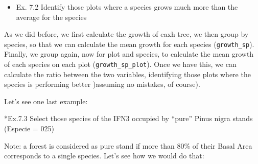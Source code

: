 \documentclass[]{article}
\newenvironment{Shaded}{\begin{snugshade}}{\end{snugshade}}
\newcommand{\KeywordTok}[1]{\textcolor[rgb]{0.13,0.29,0.53}{\textbf{#1}}}
\newcommand{\DataTypeTok}[1]{\textcolor[rgb]{0.13,0.29,0.53}{#1}}
\newcommand{\FloatTok}[1]{\textcolor[rgb]{0.00,0.00,0.81}{#1}}
\newcommand{\StringTok}[1]{\textcolor[rgb]{0.31,0.60,0.02}{#1}}
\newcommand{\OperatorTok}[1]{\textcolor[rgb]{0.81,0.36,0.00}{\textbf{#1}}}
\newcommand{\NormalTok}[1]{#1}
\providecommand{\tightlist}{%
  \setlength{\itemsep}{0pt}\setlength{\parskip}{0pt}}
\begin{document}
\begin{itemize}
\tightlist
\item
  Ex. 7.2 Identify those plots where a species grows much more than the
  average for the species
\end{itemize}

\begin{Shaded}
\end{Shaded}

As we did before, we first calculate the growth of eaxh tree, we then
group by species, so that we can calculate the mean growth for each
species (\texttt{growth\_sp}). Finally, we group again, now for plot and
species, to calculate the mean growth of each species on each plot
(\texttt{growth\_sp\_plot}). Once we have this, we can calculate the
ratio between the two variables, identifying those plots where the
species is performing better )assuming no mistakes, of course).

Let's see one last example:

*Ex.7.3 Select those species of the IFN3 occupied by ``pure'' Pinus
nigra stands (Especie = 025)

Note: a forest is considered as pure stand if more than 80\% of their
Basal Area corresponds to a single species. Let's see how we would do
that:

\begin{Shaded}
\end{Shaded}
\end{document}
